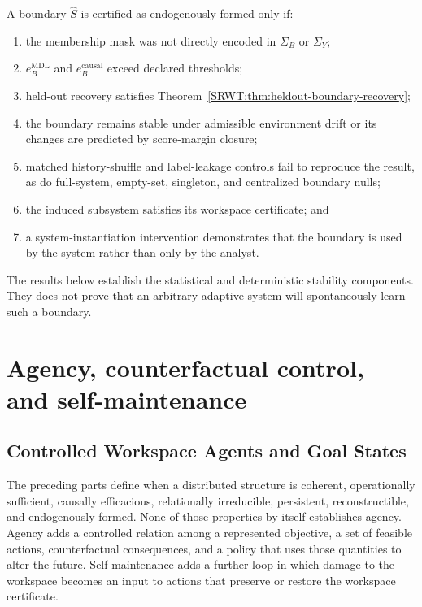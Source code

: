 A boundary \(\widehat S\) is certified as endogenously formed only if:
\begin{enumerate}
\item the membership mask was not directly encoded in \(\Sigma_B\) or
 \(\Sigma_Y\);
\item \(e_B^{\mathrm{MDL}}\) and \(e_B^{\mathrm{causal}}\) exceed declared
 thresholds;
\item held-out recovery satisfies Theorem~\ref{SRWT:thm:heldout-boundary-recovery};
\item the boundary remains stable under admissible environment drift or its
 changes are predicted by score-margin closure;
\item matched history-shuffle and label-leakage controls fail to reproduce
 the result, as do full-system, empty-set, singleton, and centralized
 boundary nulls;
\item the induced subsystem satisfies its workspace certificate; and
\item a system-instantiation intervention demonstrates that the boundary is
 used by the system rather than only by the analyst.
\end{enumerate}

The results below establish the statistical and deterministic stability components. They
does not prove that an arbitrary adaptive system will spontaneously learn such
a boundary.


\chapter{Agency, counterfactual control,\\and self-maintenance}\label{SRWT:book:chapter-82}


\section{Controlled Workspace Agents and Goal States}

The preceding parts define when a distributed structure is coherent,
operationally sufficient, causally efficacious, relationally irreducible,
persistent, reconstructible, and endogenously formed. None of those
properties by itself establishes agency. Agency adds a controlled relation
among a represented objective, a set of feasible actions, counterfactual
consequences, and a policy that uses those quantities to alter the future.
Self-maintenance adds a further loop in which damage to the workspace becomes
an input to actions that preserve or restore the workspace certificate.

